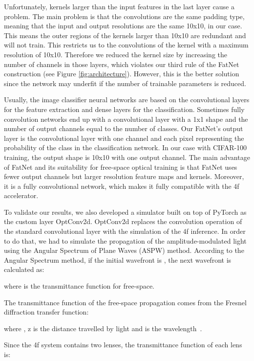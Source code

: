 \documentclass{article}
\begin{document}
Unfortunately, kernels larger than the input features in the last layer cause a problem. The main problem is that the convolutions are the same padding type, meaning that the input and output resolutions are the same 10x10, in our case. This means the outer regions of the kernels larger than 10x10 are redundant and will not train. This restricts us to the convolutions of the kernel with a maximum resolution of 10x10. Therefore we reduced the kernel size by increasing the number of channels in those layers, which violates our third rule of the FatNet construction (see Figure \ref{fig:architecture}). However, this is the better solution since the network may underfit if the number of trainable parameters is reduced. 

Usually, the image classifier neural networks are based on the convolutional layers for the feature extraction and dense layers for the classification. Sometimes fully convolution networks end up with a convolutional layer with a 1x1 shape and the number of output channels equal to the number of classes. Our FatNet's output layer is the convolutional layer with one channel and each pixel representing the probability of the class in the classification network. In our case with CIFAR-100 training, the output shape is 10x10 with one output channel. The main advantage of FatNet and its suitability for free-space optical training is that FatNet uses fewer output channels but larger resolution feature maps and kernels. Moreover, it is a fully convolutional network, which makes it fully compatible with the 4f accelerator.

To validate our results, we also developed a simulator built on top of PyTorch as the custom layer OptConv2d. OptConv2d replaces the convolution operation of the standard convolutional layer with the simulation of the 4f inference. In order to do that, we had to simulate the propagation of the amplitude-modulated light using the Angular Spectrum of Plane Waves (ASPW) method. According to the Angular Spectrum method, if the initial wavefront is , the next wavefront is calculated as:

where  is the transmittance function for free-space.

The transmittance function of the free-space propagation comes from the Fresnel diffraction transfer function:


where , z is the distance travelled by light and  is the wavelength~\cite{li_diffraction_2007, voelz_computational_2011}.

Since the 4f system contains two lenses, the transmittance function of each lens is:
\end{document}
